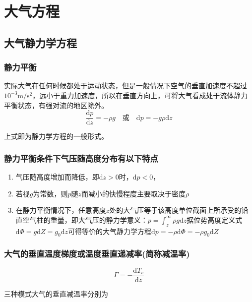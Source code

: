 \documentclass[UTF8,a4paper,11pt,oneside]{ctexbook}
\begin{document}
\chapter{大气方程}

\section{大气静力学方程}

\subsection{静力平衡}

实际大气在任何时候都处于运动状态，但是一般情况下空气的垂直加速度不超过\(10^{-3}\mathrm{m/s^2}\)，远小于重力加速度，所以在垂直方向上，可将大气看成处于流体静力平衡状态，有强对流的地区除外。
\begin{equation}
\dfrac{\mathrm{d}p}{\mathrm{d}z}=-\rho{}g\quad\text{或}\quad\mathrm{d}p=-g\rho\mathrm{d}z
\end{equation}

上式即为静力学方程的一般形式。

\subsection{静力平衡条件下气压随高度分布有以下特点}
\begin{enumerate}
    \item 气压随高度增加而降低，即\(\mathrm{d}z>0\)时，\(\mathrm{d}p<0\)，
    \item 若视\(g\)为常数，则\(p\)随\(z\)而减小的快慢程度主要取决于密度\(\rho\)
    \item 在静力平衡情况下，任意高度\(z\)处的大气压等于该高度单位截面上所承受的铅直空气柱的重量，即大气压的静力学意义：\(p=\int_z^\infty\rho{}g\mathrm{d}z\)据位势高度定义式\(\mathrm{d}\Phi=g\mathrm{d}Z=g_0\mathrm{d}z\)可得等价的大气静力学方程\(\mathrm{d}p=-\rho\mathrm{d}\Phi=-\rho{}g_0\mathrm{d}Z\)
\end{enumerate}

\subsection{大气的垂直温度梯度或温度垂直递减率(简称减温率)}
\begin{equation}
\Gamma=-\dfrac{\mathrm{d}T_v}{\mathrm{d}z}
\end{equation}

三种模式大气的垂直减温率分别为
\end{document}
